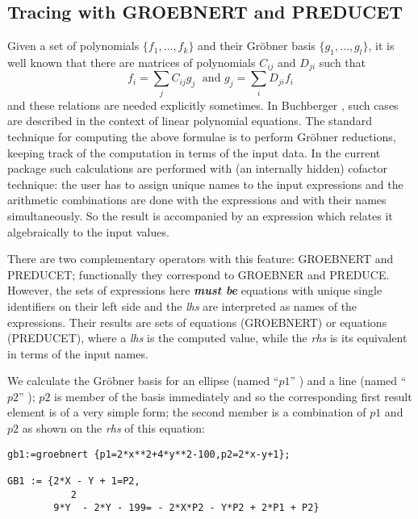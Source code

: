 \subsection{Tracing with GROEBNERT and PREDUCET}
Given a set of polynomials $\{f_1,\ldots ,f_k\}$ and their Gr\"obner
basis $\{g_1,\ldots ,g_l\}$, it is well known that there are matrices of
polynomials $C_{ij}$ and $D_{ji}$ such that
\[
f_i = \displaystyle{\sum\limits_j} C_{ij} g_j \;\mbox{  and  } g_j =
\displaystyle{\sum\limits_i} D_{ji} f_i
\]
and these relations are needed explicitly sometimes.
In {\sc Buchberger} \cite{Buchberger:85}, such cases are described in the
context of linear polynomial equations. The standard technique for
computing the above formulae is to perform
Gr\"obner reductions, keeping track of the
computation in terms of the input data. In the current package such
calculations are performed with (an internally hidden) cofactor
technique: the user has to assign unique names to the input
expressions and the  arithmetic combinations are done with the
expressions and with their names simultaneously. So the result is
accompanied by an expression which relates it algebraically to the
input values.

 
There are two complementary operators with this feature: GROEBNERT
and PREDUCET; functionally they correspond to GROEBNER and PREDUCE.
However, the sets of expressions here {\it {\bf must be}} equations
with unique single identifiers on their left side and the {\it lhs} are
interpreted as names of the expressions. Their results are
sets of equations (GROEBNERT) or equations (PREDUCET), where
a {\it lhs} is the computed value, while the {\it rhs} is its equivalent
in terms of the input names.

\example {}

We calculate the Gr\"obner basis for an ellipse (named ``$p1$'' ) and a
line (named ``$p2$'' ); $p2$ is member of the basis immediately and so
the corresponding first result element is of a very simple form; the
second member is a combination of $p1$ and $p2$ as shown on the
{\it rhs} of this equation:

\begin{verbatim}
gb1:=groebnert {p1=2*x**2+4*y**2-100,p2=2*x-y+1};

GB1 := {2*X - Y + 1=P2,
           2
        9*Y  - 2*Y - 199= - 2*X*P2 - Y*P2 + 2*P1 + P2}
\end{verbatim}

\example {}

